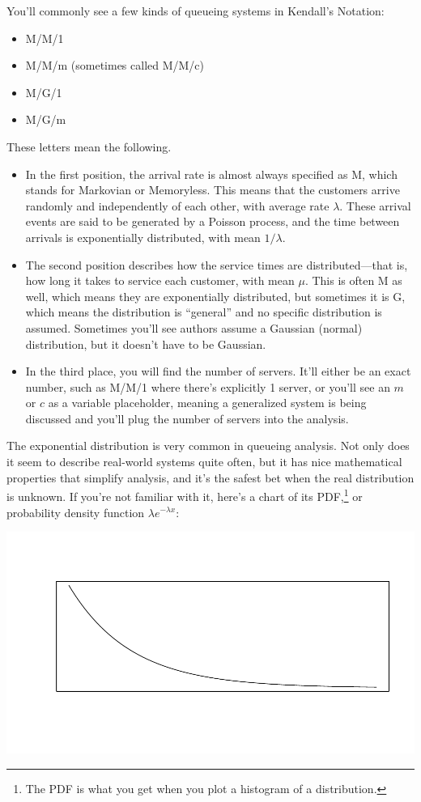 \documentclass{vivid_layout}
\begin{document}
You'll commonly see a few kinds of queueing systems in Kendall's Notation:

\begin{itemize}
\item M/M/1
\item M/M/m (sometimes called M/M/c)
\item M/G/1
\item M/G/m
\end{itemize}

These letters mean the following.

\begin{itemize}
\item In the first position, the arrival rate is almost always specified as M, which stands for Markovian or Memoryless. This means that the customers arrive randomly and independently of each other, with average rate \( \lambda \). These arrival events are said to be generated by a Poisson process, and the time between arrivals is exponentially distributed, with mean \( 1/\lambda \).
\item The second position describes how the service times are distributed---that is, how long it takes to service each customer, with mean \( \mu \). This is often M as well, which means they are exponentially distributed, but sometimes it is G, which means the distribution is ``general'' and no specific distribution is assumed. Sometimes you'll see authors assume a Gaussian (normal) distribution, but it doesn't have to be Gaussian.
\item In the third place, you will find the number of servers. It'll either be an exact number, such as M/M/1 where there's explicitly 1 server, or you'll see an $m$ or $c$ as a variable placeholder, meaning a generalized system is being discussed and you'll plug the number of servers into the analysis.
\end{itemize}

The exponential distribution is very common in queueing analysis. Not only does it seem to describe real-world systems quite often, but it has nice mathematical properties that simplify analysis, and it's the safest bet when the real distribution is unknown. If you're not familiar with it, here's a chart of its PDF,\footnote{The PDF is what you get when you plot a histogram of a distribution.} or probability density function $\lambda e^{-\lambda x}$:

\begin{center}
\includegraphics[width=.75\linewidth]{queueing-theory/exponential}
\end{center}
\end{document}
